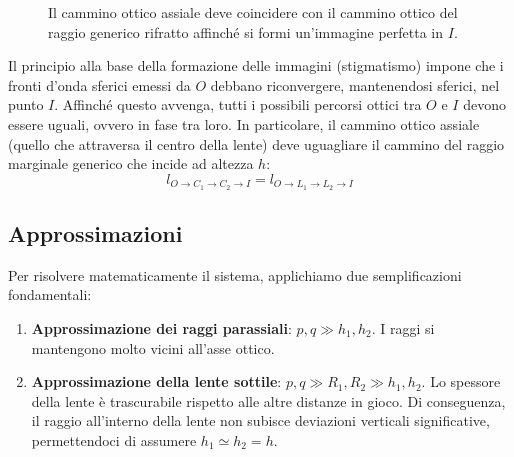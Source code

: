 \documentclass[openany,a4paper,12pt]{book}
\begin{document}
\begin{figure}[H]
\caption{Il cammino ottico assiale deve coincidere con il cammino ottico del raggio generico rifratto affinché si formi un'immagine perfetta in $I$.}
\label{fig:lente_spessa}
\end{figure}

Il principio alla base della formazione delle immagini (stigmatismo) impone che i fronti d'onda sferici emessi da $O$ debbano riconvergere, mantenendosi sferici, nel punto $I$. Affinché questo avvenga, tutti i possibili percorsi ottici tra $O$ e $I$ devono essere uguali, ovvero in fase tra loro. In particolare, il cammino ottico assiale (quello che attraversa il centro della lente) deve uguagliare il cammino del raggio marginale generico che incide ad altezza $h$:
\begin{equation}
    l_{O \to C_1 \to C_2 \to I} = l_{O \to L_1 \to L_2 \to I}
\end{equation}

\subsection*{Approssimazioni}
Per risolvere matematicamente il sistema, applichiamo due semplificazioni fondamentali:
\begin{enumerate}
    \item \textbf{Approssimazione dei raggi parassiali}: $p,q \gg h_1, h_2$. I raggi si mantengono molto vicini all'asse ottico.
    \item \textbf{Approssimazione della lente sottile}: $p,q \gg R_1, R_2 \gg h_1, h_2$. Lo spessore della lente è trascurabile rispetto alle altre distanze in gioco. Di conseguenza, il raggio all'interno della lente non subisce deviazioni verticali significative, permettendoci di assumere $h_1 \simeq h_2 = h$.
\end{enumerate}
\end{document}
